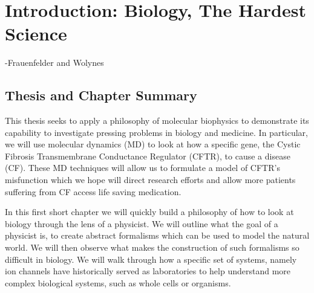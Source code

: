 \chapter{Introduction: Biology, The Hardest Science}
\label{chap:intro}
 {-Frauenfelder and Wolynes \cite{frauenfelder1994}}
\vspace
\section{Thesis and Chapter Summary}

This thesis seeks to apply a philosophy of molecular biophysics to demonstrate its capability to investigate pressing problems in biology and medicine. In particular, we will use molecular dynamics (MD) to look at how a specific gene, the Cystic Fibrosis Transmembrane Conductance Regulator (CFTR), to cause a disease (CF). These MD techniques will allow us to formulate a model of CFTR's misfunction which we hope will direct research efforts and allow more patients suffering from CF access life saving medication. 

In this first short chapter we will quickly build a philosophy of how to look at biology through the lens of a physicist. We will outline what the goal of a physicist is, to create abstract formalisms which can be used to model the natural world. We will then observe what makes the construction of such formalisms so difficult in biology. We will walk through how a specific set of systems, namely ion channels have historically served as laboratories to help understand more complex biological systems, such as whole cells or organisms. 

